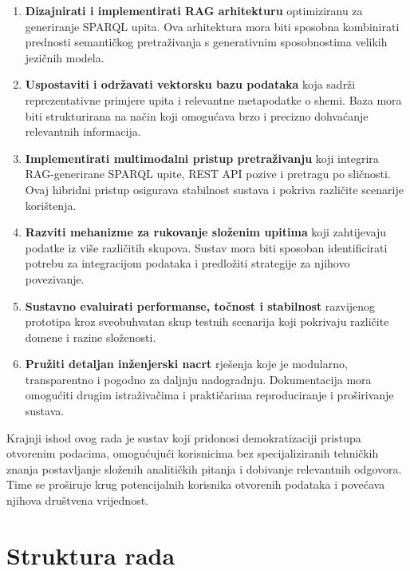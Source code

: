 \begin{enumerate}
    \item \textbf{Dizajnirati i implementirati RAG arhitekturu} optimiziranu za generiranje SPARQL upita. Ova arhitektura mora biti sposobna kombinirati prednosti semantičkog pretraživanja s generativnim sposobnostima velikih jezičnih modela.
    
    \item \textbf{Uspostaviti i održavati vektorsku bazu podataka} koja sadrži reprezentativne primjere upita i relevantne metapodatke o shemi. Baza mora biti strukturirana na način koji omogućava brzo i precizno dohvaćanje relevantnih informacija.
    
    \item \textbf{Implementirati multimodalni pristup pretraživanju} koji integrira RAG-generirane SPARQL upite, REST API pozive i pretragu po sličnosti. Ovaj hibridni pristup osigurava stabilnost sustava i pokriva različite scenarije korištenja.
    
    \item \textbf{Razviti mehanizme za rukovanje složenim upitima} koji zahtijevaju podatke iz više različitih skupova. Sustav mora biti sposoban identificirati potrebu za integracijom podataka i predložiti strategije za njihovo povezivanje.
    
    \item \textbf{Sustavno evaluirati performanse, točnost i stabilnost} razvijenog prototipa kroz sveobuhvatan skup testnih scenarija koji pokrivaju različite domene i razine složenosti.
    
    \item \textbf{Pružiti detaljan inženjerski nacrt} rješenja koje je modularno, transparentno i pogodno za daljnju nadogradnju. Dokumentacija mora omogućiti drugim istraživačima i praktičarima reproduciranje i proširivanje sustava.
\end{enumerate}

Krajnji ishod ovog rada je sustav koji pridonosi demokratizaciji pristupa otvorenim podacima, omogućujući korisnicima bez specijaliziranih tehničkih znanja postavljanje složenih analitičkih pitanja i dobivanje relevantnih odgovora. Time se proširuje krug potencijalnih korisnika otvorenih podataka i povećava njihova društvena vrijednost.

\section{Struktura rada}


